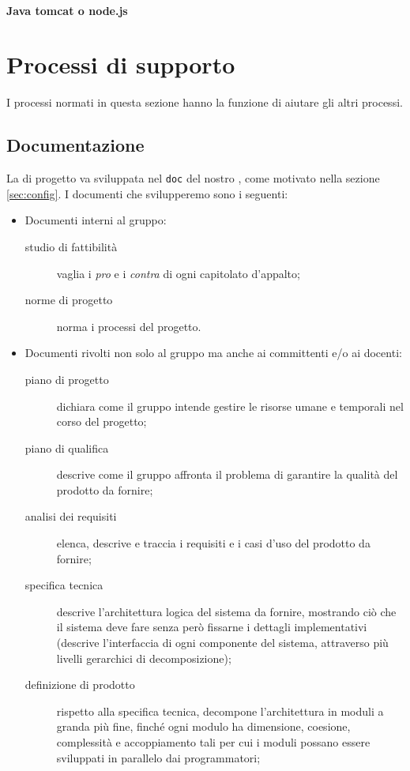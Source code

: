 \begin{itemize}
	\paragraph{Java tomcat o node.js}




\section{Processi di supporto}
I processi normati in questa sezione hanno la funzione di aiutare gli altri processi.

\subsection{Documentazione}
La  di progetto va sviluppata nel  \texttt{doc} del nostro , come motivato nella sezione \ref{sec:config}. I documenti che svilupperemo sono i seguenti:
\begin{itemize}
	\item Documenti interni al gruppo:
	\begin{description}
		\item[studio di fattibilità] vaglia i \emph{pro} e i \emph{contra} di ogni capitolato d'appalto;
		\item[norme di progetto] norma i processi del progetto.
	\end{description}
	\item Documenti rivolti non solo al gruppo ma anche ai committenti e/o ai docenti:
	\begin{description}
		\item[piano di progetto] dichiara come il gruppo intende gestire le risorse umane e temporali nel corso del progetto;
		\item[piano di qualifica] descrive come il gruppo affronta il problema di garantire la qualità del prodotto da fornire;
		\item[analisi dei requisiti] elenca, descrive e traccia i requisiti e i casi d'uso del prodotto da fornire;
		\item[specifica tecnica] descrive l'architettura logica del sistema da fornire, mostrando ciò che il sistema deve fare senza però fissarne i dettagli implementativi (descrive l'interfaccia di ogni componente del sistema, attraverso più livelli gerarchici di decomposizione);
		\item[definizione di prodotto] rispetto alla specifica tecnica, decompone l'architettura in moduli a granda più fine, finché ogni modulo ha dimensione, coesione, complessità e accoppiamento tali per cui i moduli possano essere sviluppati in parallelo dai programmatori;

\end{description}
\end{itemize}
\end{itemize}
